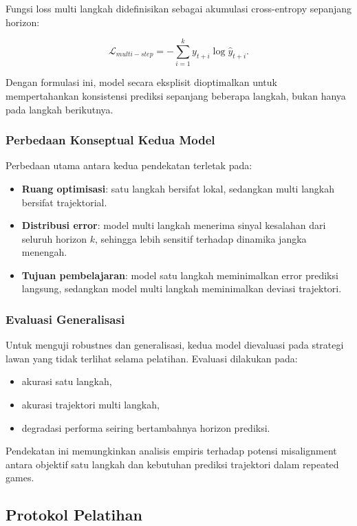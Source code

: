 Fungsi loss multi langkah didefinisikan sebagai akumulasi cross-entropy sepanjang horizon:

\[
\mathcal{L}_{multi-step}
=
-
\sum_{i=1}^{k}
y_{t+i}
\log
\hat{y}_{t+i}.
\]

Dengan formulasi ini, model secara eksplisit dioptimalkan untuk mempertahankan konsistensi prediksi sepanjang beberapa langkah, bukan hanya pada langkah berikutnya.

\subsubsection{Perbedaan Konseptual Kedua Model}

Perbedaan utama antara kedua pendekatan terletak pada:

\begin{itemize}
    \item \textbf{Ruang optimisasi}: satu langkah bersifat lokal, sedangkan multi langkah bersifat trajektorial.
    \item \textbf{Distribusi error}: model multi langkah menerima sinyal kesalahan dari seluruh horizon $k$, sehingga lebih sensitif terhadap dinamika jangka menengah.
    \item \textbf{Tujuan pembelajaran}: model satu langkah meminimalkan error prediksi langsung, sedangkan model multi langkah meminimalkan deviasi trajektori.
\end{itemize}

\subsubsection{Evaluasi Generalisasi}

Untuk menguji robustnes dan generalisasi, kedua model dievaluasi pada strategi lawan yang tidak terlihat selama pelatihan. Evaluasi dilakukan pada:

\begin{itemize}
    \item akurasi satu langkah,
    \item akurasi trajektori multi langkah,
    \item degradasi performa seiring bertambahnya horizon prediksi.
\end{itemize}

Pendekatan ini memungkinkan analisis empiris terhadap potensi misalignment antara objektif satu langkah dan kebutuhan prediksi trajektori dalam repeated games.

\subsection{Protokol Pelatihan}

